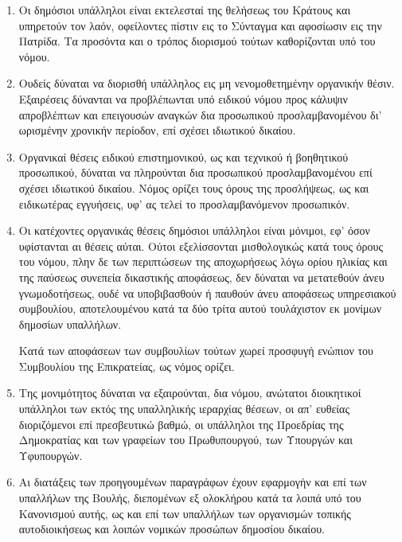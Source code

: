 \documentclass[twoside, a4paper, 10pt]{article}
\begin{document}
\begin{multicols}{2}
\begin{enumerate}
\begin{BigQuote}
\begin{enumerate}
  \item[1.] Οι δημόσιοι υπάλληλοι είναι εκτελεσταί της θελήσεως του Κράτους και υπηρετούν  τον λαόν, οφείλοντες πίστιν εις το Σύνταγμα  και αφοσίωσιν εις την Πατρίδα. Τα προσόντα και ο τρόπος διορισμού  τούτων καθορίζονται υπό του νόμου.
  \item[2.] Ουδείς δύναται να διορισθή υπάλληλος εις μη νενομοθετημένην οργανικήν θέσιν. Εξαιρέσεις δύνανται να προβλέπωνται υπό ειδικού  νόμου προς κάλυψιν απροβλέπτων και επειγουσών αναγκών δια προσωπικού προσλαμβανομένου δι' ωρισμένην χρονικήν περίοδον, επί σχέσει ιδιωτικού δικαίου.
  \item[3.] Οργανικαί θέσεις ειδικού επιστημονικού, ως και τεχνικού ή βοηθητικού προσωπικού, δύναται να πληρούνται δια προσωπικού προσλαμβανομένου επί σχέσει ιδιωτικού δικαίου. Νόμος ορίζει τους όρους της προσλήψεως, ως και ειδικωτέρας εγγυήσεις, υφ' ας τελεί το προσλαμβανόμενον προσωπικόν.
  \item[4.] Οι κατέχοντες οργανικάς θέσεις δημόσιοι υπάλληλοι είναι μόνιμοι, εφ' όσον υφίστανται αι θέσεις αύται. Ούτοι εξελίσσονται μισθολογικώς κατά τους όρους του νόμου, πλην δε των περιπτώσεων της αποχωρήσεως λόγω ορίου ηλικίας και της παύσεως συνεπεία δικαστικής αποφάσεως, δεν δύναται να μετατεθούν άνευ γνωμοδοτήσεως, ουδέ να υποβιβασθούν ή παυθούν άνευ αποφάσεως υπηρεσιακού συμβουλίου, αποτελουμένου κατά τα δύο τρίτα αυτού τουλάχιστον εκ μονίμων δημοσίων υπαλλήλων.
  
	Κατά των αποφάσεων των συμβουλίων τούτων χωρεί προσφυγή ενώπιον του Συμβουλίου της Επικρατείας, ως νόμος ορίζει.
  \item[5.] Της μονιμότητος δύναται να εξαιρούνται,  δια νόμου, ανώτατοι διοικητικοί υπάλληλοι των εκτός της υπαλληλικής ιεραρχίας θέσεων, οι απ' ευθείας διοριζόμενοι επί πρεσβευτικώ βαθμώ, οι υπάλληλοι της Προεδρίας της Δημοκρατίας και των γραφείων του Πρωθυπουργού, των Υπουργών και Υφυπουργών.
  \item[6.] Αι διατάξεις των προηγουμένων παραγράφων έχουν εφαρμογήν και επί των υπαλλήλων της Βουλής, διεπομένων εξ ολοκλήρου κατά τα λοιπά υπό του Κανονισμού αυτής, ως και επί των υπαλλήλων των οργανισμών τοπικής αυτοδιοικήσεως και λοιπών νομικών προσώπων δημοσίου δικαίου.
\end{enumerate}


\end{BigQuote}
\end{enumerate}
\end{multicols}
\end{document}
